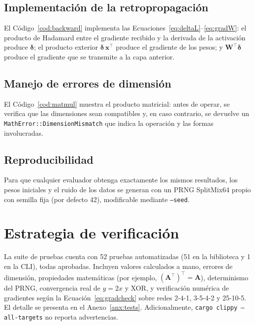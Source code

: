 

\subsection{Implementación de la retropropagación}
El Código~\ref{cod:backward} implementa las Ecuaciones~\eqref{eq:deltaL}--\eqref{eq:gradW}: el producto de Hadamard entre el gradiente recibido y la derivada de la activación produce $\boldsymbol{\delta}$; el producto exterior $\boldsymbol{\delta}\,\mathbf{x}^{\top}$ produce el gradiente de los pesos; y $\mathbf{W}^{\top}\boldsymbol{\delta}$ produce el gradiente que se transmite a la capa anterior.



\subsection{Manejo de errores de dimensión}
El Código~\ref{cod:matmul} muestra el producto matricial: antes de operar, se verifica que las dimensiones sean compatibles y, en caso contrario, se devuelve un \texttt{MathError::DimensionMismatch} que indica la operación y las formas involucradas.



\subsection{Reproducibilidad}
Para que cualquier evaluador obtenga exactamente los mismos resultados, los pesos iniciales y el ruido de los datos se generan con un PRNG SplitMix64 propio con semilla fija (por defecto 42), modificable mediante \texttt{--seed}.



\section{Estrategia de verificación}
La suite de pruebas cuenta con 52 pruebas automatizadas (51 en la biblioteca y 1 en la CLI), todas aprobadas. Incluyen valores calculados a mano, errores de dimensión, propiedades matemáticas (por ejemplo, $(\mathbf{A}^{\top})^{\top}=\mathbf{A}$), determinismo del PRNG, convergencia real de $y=2x$ y XOR, y verificación numérica de gradientes según la Ecuación~\eqref{eq:gradcheck} sobre redes 2-4-1, 3-5-4-2 y 25-10-5. El detalle se presenta en el Anexo~\ref{anx:tests}. Adicionalmente, \texttt{cargo clippy --all-targets} no reporta advertencias.

